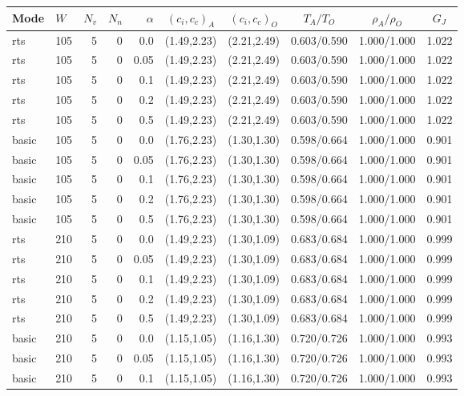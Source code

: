 \begin{tabular}{llrrrccccc}
\hline
Mode & $W$ & $N_v$ & $N_n$ & $\alpha$ & $(c_i,c_c)_A$ & $(c_i,c_c)_O$ & $T_A/T_O$ & $\rho_A/\rho_O$ & $G_J$ \\
\hline
rts & 105 & 5 & 0 & 0.0 & (1.49,2.23) & (2.21,2.49) & 0.603/0.590 & 1.000/1.000 & 1.022 \\
rts & 105 & 5 & 0 & 0.05 & (1.49,2.23) & (2.21,2.49) & 0.603/0.590 & 1.000/1.000 & 1.022 \\
rts & 105 & 5 & 0 & 0.1 & (1.49,2.23) & (2.21,2.49) & 0.603/0.590 & 1.000/1.000 & 1.022 \\
rts & 105 & 5 & 0 & 0.2 & (1.49,2.23) & (2.21,2.49) & 0.603/0.590 & 1.000/1.000 & 1.022 \\
rts & 105 & 5 & 0 & 0.5 & (1.49,2.23) & (2.21,2.49) & 0.603/0.590 & 1.000/1.000 & 1.022 \\
basic & 105 & 5 & 0 & 0.0 & (1.76,2.23) & (1.30,1.30) & 0.598/0.664 & 1.000/1.000 & 0.901 \\
basic & 105 & 5 & 0 & 0.05 & (1.76,2.23) & (1.30,1.30) & 0.598/0.664 & 1.000/1.000 & 0.901 \\
basic & 105 & 5 & 0 & 0.1 & (1.76,2.23) & (1.30,1.30) & 0.598/0.664 & 1.000/1.000 & 0.901 \\
basic & 105 & 5 & 0 & 0.2 & (1.76,2.23) & (1.30,1.30) & 0.598/0.664 & 1.000/1.000 & 0.901 \\
basic & 105 & 5 & 0 & 0.5 & (1.76,2.23) & (1.30,1.30) & 0.598/0.664 & 1.000/1.000 & 0.901 \\
rts & 210 & 5 & 0 & 0.0 & (1.49,2.23) & (1.30,1.09) & 0.683/0.684 & 1.000/1.000 & 0.999 \\
rts & 210 & 5 & 0 & 0.05 & (1.49,2.23) & (1.30,1.09) & 0.683/0.684 & 1.000/1.000 & 0.999 \\
rts & 210 & 5 & 0 & 0.1 & (1.49,2.23) & (1.30,1.09) & 0.683/0.684 & 1.000/1.000 & 0.999 \\
rts & 210 & 5 & 0 & 0.2 & (1.49,2.23) & (1.30,1.09) & 0.683/0.684 & 1.000/1.000 & 0.999 \\
rts & 210 & 5 & 0 & 0.5 & (1.49,2.23) & (1.30,1.09) & 0.683/0.684 & 1.000/1.000 & 0.999 \\
basic & 210 & 5 & 0 & 0.0 & (1.15,1.05) & (1.16,1.30) & 0.720/0.726 & 1.000/1.000 & 0.993 \\
basic & 210 & 5 & 0 & 0.05 & (1.15,1.05) & (1.16,1.30) & 0.720/0.726 & 1.000/1.000 & 0.993 \\
basic & 210 & 5 & 0 & 0.1 & (1.15,1.05) & (1.16,1.30) & 0.720/0.726 & 1.000/1.000 & 0.993 \\

\end{tabular}

